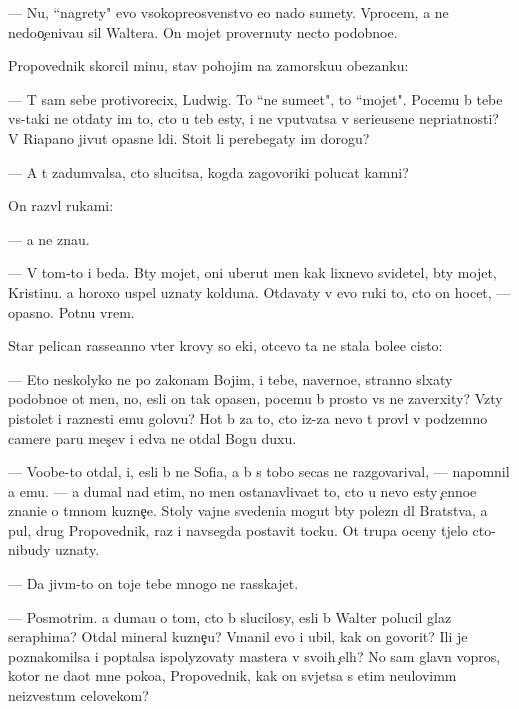 \documentclass[10pt]{book}
\begin{document}
— Nu, ``nagrety" {\y}evo v{\yi}sokopreosv{\ia}{\x}enstvo {\y}e{\x}o nado sumety. Vprocem, {\y}a ne nedoo{\c}eniva{\y}u sil{\yi} Waltera. On mojet provernuty necto podobno{\y}e.

Propovednik skorcil minu, stav pohojim na zamorsku{\y}u obez{\y}anku:

— T{\yi} sam sebe protivorecix, Ludwig. To ``ne sume{\y}et", to ``mojet". Pocemu b{\yi} tebe vs{\e}-taki ne otdaty im to, cto u teb{\ia} {\y}esty, i ne vput{\yi}vatsa v serieusen{\yi}{\y}e nepri{\y}atnosti? V Riapano jivut opasn{\yi}{\y}e l{\io}di. Sto{\y}it li perebegaty im dorogu?

— A t{\yi} zadum{\yi}valsa, cto slucitsa, kogda zagovor{\x}iki polucat kamni?

On razv{\e}l rukami:

— {\Y}a ne zna{\y}u.

— V tom-to i beda. B{\yi}ty mojet, oni uberut men{\ia} kak lixnevo svidetel{\ia}, b{\yi}ty mojet, Kristinu. {\Y}a horoxo uspel uznaty kolduna. Otdavaty v {\y}evo ruki to, cto on hocet, — opasno. Pot{\ia}nu vrem{\ia}.

Star{\yi}{\y} pelican rasse{\y}anno v{\yi}ter krovy so {\x}eki, otcevo ta ne stala bole{\y}e cisto{\y}:

— Eto neskolyko ne po zakonam Boj{\yf}im, i tebe, naverno{\y}e, stranno sl{\yi}xaty podobno{\y}e ot men{\ia}, no, {\y}esli on tak opasen, pocemu b{\yi} prosto vs{\e} ne zaverxity? Vz{\ia}ty pistolet i raznesti {\y}emu golovu? Hot{\ia} b{\yi} za to, cto iz-za nevo t{\yi} prov{\e}l v podzemno{\y} camere paru mes{\ia}{\c}ev i {\y}edva ne otdal Bogu duxu.

— Voob{\x}e-to otdal, i, {\y}esli b{\yi} ne Sofi{\y}a, {\y}a b{\yi} s tobo{\y} se{\y}cas ne razgovarival, — napomnil {\y}a {\y}emu. — {\Y}a dumal nad etim, no men{\ia} ostanavliva{\y}et to, cto u nevo {\y}esty {\c}enno{\y}e znani{\y}e o t{\e}mnom kuzne{\c}e. Stoly vajn{\yi}{\y}e svedeni{\y}a mogut b{\yi}ty polezn{\yi} dl{\ia} Bratstva, a pul{\ia}, drug Propovednik, raz i navsegda postavit tocku. Ot trupa oceny t{\ia}jelo cto-nibudy uznaty.

— Da jiv{\yi}m-to on toje tebe mnogo ne rasskajet.

— Posmotrim. {\Y}a duma{\y}u o tom, cto b{\yi} slucilosy, {\y}esli b{\yi} Walter polucil glaz seraphima? Otdal mineral kuzne{\c}u? V{\yi}manil {\y}evo i ubil, kak on govorit? Ili je poznakomilsa i pop{\yi}talsa ispolyzovaty mastera v svo{\y}ih {\c}el{\ia}h? No sam{\yi}{\y} glavn{\yi}{\y} vopros, kotor{\yi}{\y} ne da{\y}ot mne poko{\y}a, Propovednik, kak on sv{\ia}jetsa s etim neulovim{\yi}m neizvestn{\yi}m celovekom?
\end{document}
